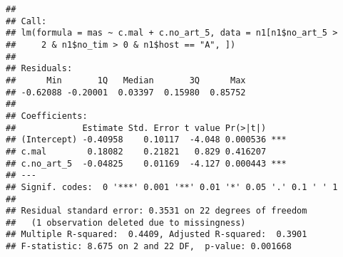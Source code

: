 \documentclass[]{article}
\begin{document}
\begin{verbatim}
## 
## Call:
## lm(formula = mas ~ c.mal + c.no_art_5, data = n1[n1$no_art_5 > 
##     2 & n1$no_tim > 0 & n1$host == "A", ])
## 
## Residuals:
##      Min       1Q   Median       3Q      Max 
## -0.62088 -0.20001  0.03397  0.15980  0.85752 
## 
## Coefficients:
##             Estimate Std. Error t value Pr(>|t|)    
## (Intercept) -0.40958    0.10117  -4.048 0.000536 ***
## c.mal        0.18082    0.21821   0.829 0.416207    
## c.no_art_5  -0.04825    0.01169  -4.127 0.000443 ***
## ---
## Signif. codes:  0 '***' 0.001 '**' 0.01 '*' 0.05 '.' 0.1 ' ' 1
## 
## Residual standard error: 0.3531 on 22 degrees of freedom
##   (1 observation deleted due to missingness)
## Multiple R-squared:  0.4409, Adjusted R-squared:  0.3901 
## F-statistic: 8.675 on 2 and 22 DF,  p-value: 0.001668
\end{verbatim}
\end{document}
